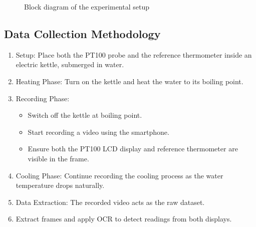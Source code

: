 \documentclass[conference]{IEEEtran}
\begin{document}
\begin{figure}[H]
{
}
\caption{Block diagram of the experimental setup}
\label{fig:setup}
\end{figure}

\subsection{Data Collection Methodology}\label{data-collection-methodology}
\begin{enumerate}
    \item {Setup:} Place both the PT100 probe and the reference thermometer inside an electric kettle, submerged in water.
    \item {Heating Phase:} Turn on the kettle and heat the water to its boiling point.
    \item {Recording Phase:} 
    \begin{itemize}
        \item Switch off the kettle at boiling point.
        \item Start recording a {video} using the smartphone.
        \item Ensure {both the PT100 LCD display} and {reference thermometer} are visible in the frame.
    \end{itemize}
    \item {Cooling Phase:} Continue recording the cooling process as the water temperature drops naturally.
    \item {Data Extraction:} The recorded video acts as the raw dataset.
        \item Extract frames and apply OCR to detect readings from both displays.
\end{enumerate}
\end{document}
